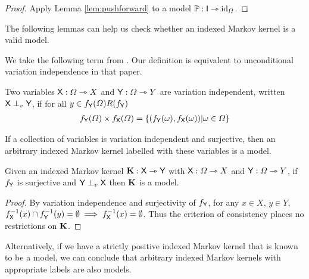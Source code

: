 \begin{proof}
Apply Lemma \ref{lem:pushforward} to a model $\mathbb{P}:\mathsf{I}\rightarrowtriangle\text{id}_{\Omega}$.
\end{proof}

The following lemmas can help us check whether an indexed Markov kernel is a valid model.



We take the following term from \citet{constantinou_extended_2017}. Our definition is equivalent to unconditional variation independence in that paper.

\begin{definition}
Two variables $\mathsf{X}:\Omega\rightarrowtriangle X$ and $\mathsf{Y}:\Omega\rightarrowtriangle Y$ are variation independent, written $\mathsf{X}\perp_v \mathsf{Y}$, if for all $y\in f_{\mathsf{Y}}(\Omega)R(f_{\mathsf{Y}})$
\begin{align}
 f_{\mathsf{Y}}(\Omega) \times f_{\mathsf{X}}(\Omega) = \{(f_{\mathsf{Y}}(\omega),f_{\mathsf{X}}(\omega))|\omega\in \Omega\}
\end{align}
\end{definition}

If a collection of variables is variation independent and surjective, then an arbitrary indexed Markov kernel labelled with these variables is a model.

\begin{lemma}\label{lem:var_indep}
Given an indexed Markov kernel $\mathbf{K}:\mathsf{X} \rightarrowtriangle \mathsf{Y}$ with $\mathsf{X}:\Omega\rightarrowtriangle X$ and $\mathsf{Y}:\Omega\rightarrowtriangle Y$, if $f_{\mathsf{Y}}$ is surjective and $\mathsf{Y}\perp_v \mathsf{X}$ then $\mathbf{K}$ is a model.
\end{lemma}

\begin{proof}
By variation independence and surjectivity of $f_{\mathsf{Y}}$, for any $x\in X$, $y\in Y$, $f_{\mathsf{X}}^{-1}(x)\cap f_{\mathsf{Y}}^{-1}(y) = \emptyset \implies f_{\mathsf{X}}^{-1}(x) = \emptyset$. Thus the criterion of consistency places no restrictions on $\mathbf{K}$.
\end{proof}


Alternatively, if we have a strictly positive indexed Markov kernel that is known to be a model, we can conclude that arbitrary indexed Markov kernels with appropriate labels are also models.

